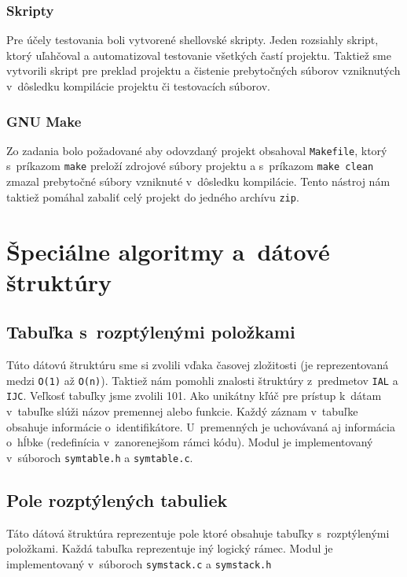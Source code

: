 \documentclass[a4paper, 11pt]{article}
\begin{document}
    \subsubsection{Skripty}
    Pre účely testovania boli vytvorené shellovské skripty. Jeden rozsiahly skript, ktorý uľahčoval a automatizoval
    testovanie všetkých častí projektu. Taktiež sme vytvorili skript pre preklad projektu a čistenie prebytočných súborov
    vzniknutých v~dôsledku kompilácie projektu či testovacích súborov.

    \subsubsection{GNU Make}
    Zo zadania bolo požadované aby odovzdaný projekt obsahoval \texttt{Makefile}, ktorý s~príkazom
    \texttt{make} preloží zdrojové súbory projektu a s~príkazom \texttt{make clean} zmazal prebytočné súbory vzniknuté v~dôsledku kompilácie.
    Tento nástroj nám taktiež pomáhal zabaliť celý projekt do jedného archívu \texttt{zip}.





    \section{Špeciálne algoritmy a~dátové štruktúry}

    \subsection{Tabuľka s~rozptýlenými položkami}
    Túto dátovú štruktúru sme si zvolili vďaka časovej zložitosti
    (je reprezentovaná medzi \texttt{O(1)} až \texttt{O(n)}). Taktiež nám pomohli znalosti štruktúry
    z~predmetov \texttt{IAL} a \texttt{IJC}. Veľkosť tabuľky jsme zvolili 101.
    Ako unikátny kľúč pre prístup k~dátam v~tabuľke slúži názov premennej alebo funkcie.
    Každý záznam v~tabuľke obsahuje informácie o~identifikátore. U~premenných je uchovávaná aj informácia
    o~hĺbke (redefinícia v~zanorenejšom rámci kódu). Modul je implementovaný v~súboroch
    \texttt{symtable.h} a \texttt{symtable.c}.


    \subsection{Pole rozptýlených tabuliek}
    Táto dátová štruktúra reprezentuje pole ktoré obsahuje tabuľky s~rozptýlenými položkami. Každá tabuľka reprezentuje
    iný logický rámec.
    Modul je implementovaný v~súboroch \texttt{symstack.c} a \texttt{symstack.h}
\end{document}
